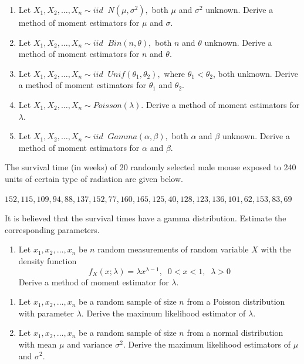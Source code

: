 \documentclass[]{book}
\providecommand{\tightlist}{%
  \setlength{\itemsep}{0pt}\setlength{\parskip}{0pt}}
\begin{document}
\begin{enumerate}
\def\labelenumi{\arabic{enumi}.}
\item
  Let \(X_1, X_2, \dots, X_n \sim iid\;\; N(\mu, \sigma^2),\) both \(\mu\) and \(\sigma^2\) unknown. Derive a method of moment estimators for \(\mu\) and \(\sigma\).
\item
  Let \(X_1, X_2, \dots, X_n \sim iid\;\; Bin(n,\theta),\) both \(n\) and \(\theta\) unknown. Derive a method of moment estimators for \(n\) and \(\theta\).
\item
  Let \(X_1, X_2, \dots, X_n \sim iid\;\; Unif(\theta_1,\theta_2),\) where \(\theta_1<\theta_2\), both unknown. Derive a method of moment estimators for \(\theta_1\) and \(\theta_2\).
\item
  Let \(X_1, X_2, \dots, X_n \sim Poisson(\lambda).\) Derive a method of moment estimators for \(\lambda\).
\item
  Let \(X_1, X_2, \dots, X_n \sim iid\;\; Gamma(\alpha,\beta),\) both \(\alpha\) and \(\beta\) unknown. Derive a method of moment estimators for \(\alpha\) and \(\beta\).
\end{enumerate}

The survival time (in weeks) of 20 randomly selected male mouse exposed to 240 units of certain type of radiation are given below.

\(152, 115, 109, 94, 88, 137, 152, 77, 160, 165, 125, 40, 128, 123, 136, 101, 62, 153, 83, 69\)

It is believed that the survival times have a gamma distribution. Estimate the corresponding parameters.

\begin{enumerate}
\def\labelenumi{\arabic{enumi}.}
\setcounter{enumi}{5}
\tightlist
\item
  Let \(x_1, x_2, \dots, x_n\) be \(n\) random measurements of random variable \(X\) with the density function
  \[f_X(x;\lambda)= \lambda x^{\lambda-1},\;\; 0<x<1, \;\; \lambda>0\]
  Derive a method of moment estimator for \(\lambda\).
\end{enumerate}

\begin{enumerate}
\def\labelenumi{\arabic{enumi}.}
\setcounter{enumi}{6}
\item
  Let \(x_1, x_2, \dots, x_n\) be a random sample of size \(n\) from a Poisson distribution with parameter \(\lambda\). Derive the maximum likelihood estimator of \(\lambda\).
\item
  Let \(x_1, x_2, \dots, x_n\) be a random sample of size \(n\) from a normal distribution with mean \(\mu\) and variance \(\sigma^2\). Derive the maximum likelihood estimators of \(\mu\) and \(\sigma^2\).
\end{enumerate}
\end{document}
